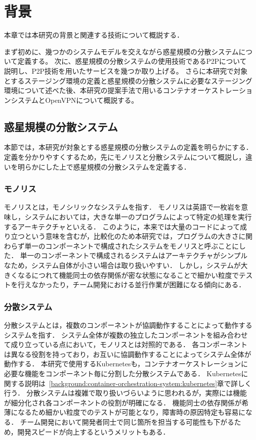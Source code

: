 \chapter{背景}
\label{background}

本章では本研究の背景と関連する技術について概説する．

まず初めに、幾つかのシステムモデルを交えながら惑星規模の分散システムについて定義する。
次に、惑星規模の分散システムの使用技術であるP2Pについて説明し、P2P技術を用いたサービスを幾つか取り上げる。
さらに本研究で対象とするステージング環境の定義と惑星規模の分散システムに必要なステージング環境について述べた後、本研究の提案手法で用いるコンテナオーケストレーションシステムとOpenVPNについて概説する。

\section{惑星規模の分散システム}
\label{bg:definition}

本節では，本研究が対象とする惑星規模の分散システムの定義を明らかにする．
定義を分かりやすくするため，先にモノリスと分散システムについて概説し，違いを明らかにした上で惑星規模の分散システムを定義する．

\subsection{モノリス}
\label{bg:definition:monolith}

モノリスとは，モノシリックなシステムを指す．
モノリスは英語で一枚岩を意味し，システムにおいては，大きな単一のプログラムによって特定の処理を実行するアーキテクチャといえる．
このように，本来では大量のコードによって成り立つという意味を含むが，比較化のため本研究では，プログラムの大きさに関わらず単一のコンポーネントで構成されたシステムをモノリスと呼ぶことにした．
単一のコンポーネントで構成されるシステムはアーキテクチャがシンプルなため，システム自体が小さい場合は取り扱いやすい．
しかし，システムが大きくなるにつれて機能同士の依存関係が密な状態になることで細かい粒度でテストを行えなかったり，チーム開発における並行作業が困難になる傾向にある．

\subsection{分散システム}
\label{bg:definition:distributed-system}

分散システムとは，複数のコンポーネントが協調動作することによって動作するシステムを指す．
システム全体が複数の独立したコンポーネントを組み合わせて成り立っている点において，モノリスとは対照的である．
各コンポーネントは異なる役割を持っており，お互いに協調動作することによってシステム全体が動作する．
本研究で使用するKubernetesも，コンテナオーケストレーションに必要な機能をコンポーネント毎に分割した分散システムである．
Kubernetesに関する説明は~\ref{background:container-orchestration-system:kubernetes}章で詳しく行う．
分散システムは複雑で取り扱いづらいように思われるが，実際には機能が細分化され各コンポーネントの役割が明確になる．
機能同士の依存関係が希薄になるため細かい粒度でのテストが可能となり，障害時の原因特定も容易になる．
チーム開発において開発者同士で同じ箇所を担当する可能性も下がるため，開発スピードが向上するというメリットもある．

